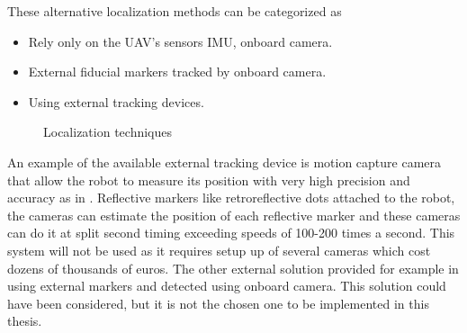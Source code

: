 These alternative localization methods can be categorized as     
\begin{itemize}
\item Rely only on the UAV's sensors IMU, onboard camera.
\item External fiducial markers tracked by onboard camera.
\item Using external tracking devices.
\end{itemize}

\begin{figure}[!h]
  \centering
  \hfill
  \caption{Localization techniques}
  \label{fig:final_room}
\end{figure}

An example of the available external tracking device is motion capture camera that allow the robot to measure its position with very high precision and accuracy as in \cite{michael2010grasp}. Reflective markers like retroreflective dots attached to the robot, the cameras can estimate the position of each reflective marker and these cameras can do it at split second timing exceeding speeds of 100-200 times a second. This system will not be used as it requires setup up of several cameras which cost dozens of thousands of euros. The other external solution provided for example in  \cite{meier2012pixhawk} using external markers and detected using onboard camera. This solution could have been considered, but it is not the chosen one to be implemented in this thesis. 
 
